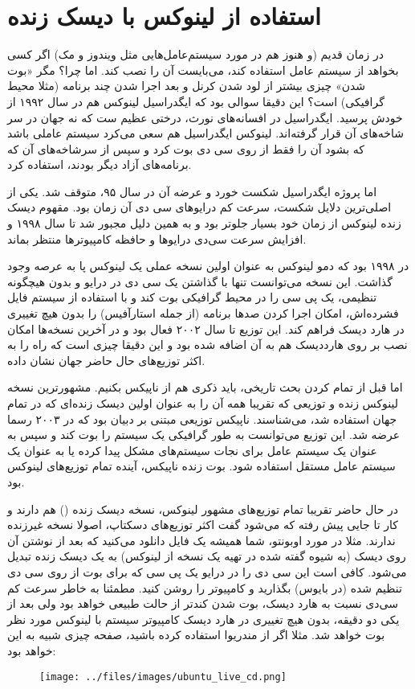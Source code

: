 \section{استفاده از لینوکس با دیسک زنده}
در زمان قدیم (و هنوز هم در مورد سیستم‌عامل‌هایی مثل ویندوز و مک) اگر کسی بخواهد از سیستم عامل استفاده کند، می‌بایست آن را نصب کند. اما چرا؟ مگر «بوت شدن» چیزی بیشتر از لود شدن کرنل و بعد اجرا شدن چند برنامه (مثلا محیط گرافیکی) است؟ این دقیقا سوالی بود که ایگدراسیل لینوکس هم در سال ۱۹۹۲ از خودش پرسید. ایگدراسیل در افسانه‌های نورث، درختی عظیم ست که نه جهان در سر شاخه‌های آن قرار گرفته‌اند. لینوکس ایگدراسیل هم سعی می‌کرد سیستم عاملی باشد که بشود آن را فقط از روی سی دی بوت کرد و سپس از سرشاخه‌های آن که برنامه‌های آزاد دیگر بودند، استفاده کرد.

اما پروژه ایگدراسیل شکست خورد و عرضه آن در سال ۹۵، متوقف شد. یکی از اصلی‌ترین دلایل شکست، سرعت کم درایوهای سی دی آن زمان بود. مقهوم دیسک زنده لینوکس از زمان خود بسیار جلوتر بود و به همین دلیل مجبور شد تا سال ۱۹۹۸ و افزایش سرعت سی‌دی‌ درایوها و حافظه کامپیوترها منتظر بماند.

در ۱۹۹۸ بود که دمو لینوکس به عنوان اولین نسخه عملی یک لینوکس پا به عرصه وجود گذاشت. این نسخه می‌توانست تنها با گذاشتن یک سی دی در درایو و بدون هیچگونه تنظیمی، یک پی سی را در محیط گرافیکی بوت کند و با استفاده از سیستم فایل فشرده‌اش، امکان اجرا کردن صدها برنامه (از جمله استارآفیس) را بدون هیچ تغییری در هارد دیسک فراهم کند. این توزیع تا سال ۲۰۰۲ فعال بود و در آخرین نسخه‌ها امکان نصب بر روی هارددیسک هم به آن اضافه شده بود و این دقیقا چیزی است که راه را به اکثر توزیع‌های حال حاضر جهان نشان داده.

اما قبل از تمام کردن بحث تاریخی، باید ذکری هم از ناپیکس بکنیم. مشهورترین نسخه لینوکس زنده و توزیعی که تقریبا همه آن را به عنوان اولین دیسک زنده‌ای که در تمام جهان استفاده شد، می‌شناسند. ناپیکس توزیعی مبتنی بر دبیان بود که در ۲۰۰۳ رسما عرضه شد. این توزیع می‌توانست به طور گرافیکی یک سیستم را بوت کند و سپس به عنوان یک سیستم عامل برای نجات سیستم‌های مشکل پیدا کرده یا به عنوان یک سیستم عامل مستقل استفاده شود. بوت زنده ناپیکس،‌ آینده تمام توزیع‌های لینوکس بود.

در حال حاضر تقریبا تمام توزیع‌های مشهور لینوکس، نسخه دیسک زنده () هم دارند و کار تا جایی پیش رفته که می‌شود گفت اکثر توزیع‌های دسکتاپ، اصولا نسخه غیرزنده ندارند. مثلا در مورد اوبونتو، شما همیشه یک فایل  دانلود می‌کنید که بعد از نوشتن آن روی دیسک (به شیوه گفته شده در تهیه یک نسخه از لینوکس) به یک دیسک زنده تبدیل می‌شود. کافی است این سی دی را در درایو یک پی سی که برای بوت از روی سی دی تنظیم شده (در بایوس) بگذارید و کامپیوتر را روشن کنید. مطمئنا به خاطر سرعت کم سی‌دی نسبت به هارد دیسک، بوت شدن کندتر از حالت طبیعی خواهد بود ولی بعد از یکی دو دقیقه، بدون هیچ تغییری در هارد دیسک کامپیوتر سیستم با لینوکس مورد نظر بوت خواهد شد. مثلا اگر از مندریوا استفاده کرده باشید، صفحه چیزی شبیه به این خواهد بود:
\begin{figure}[h]
	\texttt{[image: ../files/images/ubuntu\_live\_cd.png]}
\end{figure}


